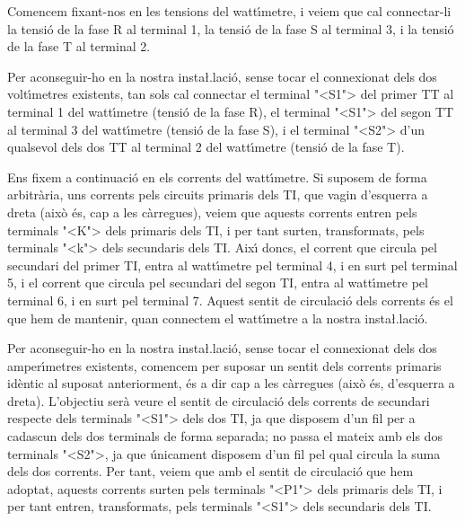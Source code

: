 \begin{exemple}
Comencem fixant-nos en les tensions del watt\'{\i}metre, i veiem que cal
connectar-li la tensi\'{o} de la fase R al terminal 1, la tensi\'{o} de la
fase S al terminal 3, i la tensi\'{o} de la fase T al terminal 2.

Per aconseguir-ho en la nostra insta{\l.l}aci\'{o}, sense tocar el
connexionat dels dos volt\'{\i}metres existents, tan sols cal connectar
el terminal {"<}\textsf{S1}{">} del primer TT al terminal 1 del watt\'{\i}metre (tensi\'{o} de
la fase R), el terminal {"<}\textsf{S1}{">} del segon TT al terminal 3 del watt\'{\i}metre
(tensi\'{o} de la fase S), i el terminal {"<}\textsf{S2}{">} d'un qualsevol dels dos TT
al terminal 2 del watt\'{\i}metre (tensi\'{o} de la fase T).

Ens fixem a continuaci\'{o} en els corrents del watt\'{\i}metre. Si suposem
de forma arbitr\`{a}ria, uns corrents pels circuits primaris dels TI,
que vagin d'esquerra a dreta (aix\`{o} \'{e}s, cap a les c\`{a}rregues), veiem
que aquests corrents entren pels terminals {"<}\textsf{K}{">} dels primaris dels TI,
i per tant surten, transformats, pels terminals {"<}\textsf{k}{">} dels secundaris
dels TI. Aix\'{\i} doncs, el corrent que circula pel secundari del primer
TI, entra al watt\'{\i}metre pel terminal 4, i en surt pel terminal 5, i
el corrent que circula pel secundari del segon TI, entra al
watt\'{\i}metre pel terminal 6, i en surt pel terminal 7. Aquest sentit
de circulaci\'{o} dels corrents \'{e}s el que hem de mantenir, quan
connectem el watt\'{\i}metre a la nostra insta{\l.l}aci\'{o}.

Per aconseguir-ho en la nostra insta{\l.l}aci\'{o}, sense tocar el
connexionat dels dos amper\'{\i}metres existents, comencem per suposar un
sentit dels corrents primaris id\`{e}ntic al suposat anteriorment, \'{e}s a
dir cap a les c\`{a}rregues (aix\`{o} \'{e}s, d'esquerra a dreta). L'objectiu
ser\`{a} veure el sentit de circulaci\'{o} dels corrents de secundari
respecte dels terminals {"<}\textsf{S1}{">} dels dos TI, ja que disposem d'un fil per
a cadascun dels dos terminals de forma separada; no passa el mateix
amb els dos terminals {"<}\textsf{S2}{">}, ja que \'{u}nicament disposem d'un fil pel
qual circula la suma dels dos corrents. Per tant, veiem que amb el
sentit de circulaci\'{o} que hem adoptat, aquests corrents surten pels
terminals {"<}\textsf{P1}{">} dels primaris dels TI, i per tant entren, transformats,
pels terminals {"<}\textsf{S1}{">} dels secundaris dels TI.


\end{exemple}
